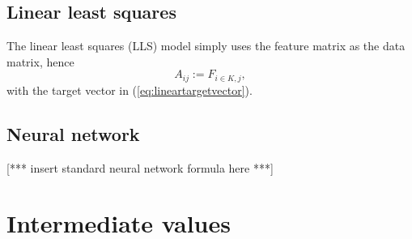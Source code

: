 \documentclass[12pt]{article}
\def\D{\displaystyle}
\def\att{                    %
        \marginpar[ \hspace*{\fill} \raisebox{-0.2em}{\rule{2mm}{1.2em}} ]
        {\raisebox{-0.2em}{\rule{2mm}{1.2em}} }
        }
\def\at#1{[*** \att #1 ***]}  %
\begin{document}
\subsection{Linear least squares}
\label{subsec:LLS}
The linear least squares (LLS) model simply uses the feature matrix as the data matrix, hence
\begin{equation}
	\label{eq:lls}
	A_{ij} := F_{i\in K, j},
\end{equation}
with the target vector in (\ref{eq:lineartargetvector}).

\subsection{Neural network}
\label{subsec:NN}
\at{insert standard neural network formula here}


\iffalse
&= \frac{\D \left(\sum_{k\in K} \frac{E_k + \sum_l \theta_{kl} \phi_{kl}(w)}{D_k(w)} / S_K(w)\right) - \left(E_j + \sum_l \theta_{jl} \phi_{jl}(w)\right)}{D_j(w)S_K(w)-1}, \\
\fi

\section{Intermediate values}
\label{sec:intermediate}
\end{document}
